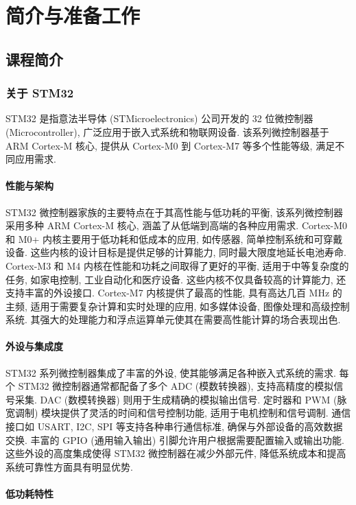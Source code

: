 \part{简介与准备工作}
\chapter{课程简介}
\section{关于 STM32}
STM32 是指意法半导体 (STMicroelectronics) 公司开发的 32 位微控制器 (Microcontroller), 广泛应用于嵌入式系统和物联网设备. 该系列微控制器基于 ARM Cortex-M 核心, 提供从 Cortex-M0 到 Cortex-M7 等多个性能等级, 满足不同应用需求.

\subsection{性能与架构}

STM32 微控制器家族的主要特点在于其高性能与低功耗的平衡, 该系列微控制器采用多种 ARM Cortex-M 核心, 涵盖了从低端到高端的各种应用需求. Cortex-M0 和 M0+ 内核主要用于低功耗和低成本的应用, 如传感器, 简单控制系统和可穿戴设备. 这些内核的设计目标是提供足够的计算能力, 同时最大限度地延长电池寿命. Cortex-M3 和 M4 内核在性能和功耗之间取得了更好的平衡, 适用于中等复杂度的任务, 如家电控制, 工业自动化和医疗设备. 这些内核不仅具备较高的计算能力, 还支持丰富的外设接口. Cortex-M7 内核提供了最高的性能, 具有高达几百 MHz 的主频, 适用于需要复杂计算和实时处理的应用, 如多媒体设备, 图像处理和高级控制系统. 其强大的处理能力和浮点运算单元使其在需要高性能计算的场合表现出色.

\subsection{外设与集成度}

STM32 系列微控制器集成了丰富的外设, 使其能够满足各种嵌入式系统的需求. 每个 STM32 微控制器通常都配备了多个 ADC (模数转换器), 支持高精度的模拟信号采集. DAC (数模转换器) 则用于生成精确的模拟输出信号. 定时器和 PWM (脉宽调制) 模块提供了灵活的时间和信号控制功能, 适用于电机控制和信号调制. 通信接口如 USART, I2C, SPI 等支持各种串行通信标准, 确保与外部设备的高效数据交换. 丰富的 GPIO (通用输入输出) 引脚允许用户根据需要配置输入或输出功能. 这些外设的高度集成使得 STM32 微控制器在减少外部元件, 降低系统成本和提高系统可靠性方面具有明显优势.

\subsection{低功耗特性}

